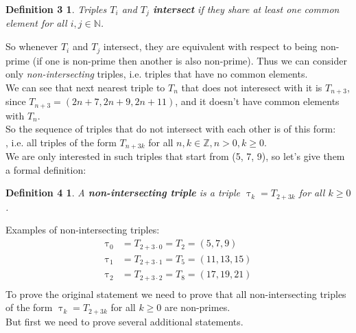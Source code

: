 \documentclass[11pt]{article}
\begin{document}
   \newtheorem*{Definition3}{Definition 3}
   \begin{Definition3}
      Triples $T_{i}$ and $T_{j}$ \textbf{intersect} if they share at least one common element for all $i, j \in \mathbb{N}$.
   \end{Definition3}
   So whenever $T_{i}$ and $T_{j}$ intersect, they are equivalent with respect to being non-prime (if one is non-prime then another is also non-prime).
   Thus we can consider only \emph{non-intersecting} triples, i.e. triples that have no common elements.\\
   We can see that next nearest triple to $T_{n}$  that does not interesect with it is $T_{n + 3}$, since $T_{n + 3} = (2n + 7, 2n + 9, 2n + 11)$, and it doesn't have common elements with $T_{n}$.\\
   So the sequence of triples that do not intersect with each other is of this form:\\
   \begin{equation*}
   [T_{n}, T_{n + 3}, T_{n + 6}, ...]
   \end{equation*}
   , i.e.  all triples of the form $T_{n + 3k}$ for all $n, k \in \mathbb{Z}, n > 0, k \geq 0$.\\
   We are only interested in such triples that start from (5, 7, 9), so let's give them a formal definition:
   \newtheorem*{Definition4}{Definition 4}
   \begin{Definition4}
   A \textbf{non-intersecting triple} is a triple $\uptau_{k} = T_{2 + 3k}$ for all $k \geq 0$.
   \end{Definition4}
   Examples of non-intersecting triples:
   \begin{align*}
   \uptau_{0} &= T_{2 + 3\cdot0} = T_{2} = (5, 7, 9)\\
   \uptau_{1} &= T_{2 + 3\cdot1} = T_{5} = (11, 13, 15)\\
   \uptau_{2} &= T_{2 + 3\cdot2} = T_{8} = (17, 19, 21)\\
   \end{align*}
   To prove the original statement we need to prove that all non-intersecting triples of the form $\uptau_{k} = T_{2 + 3k}$ for all $k \geq 0$ are non-primes.\\
   But first we need to prove several additional statements.
\end{document}

